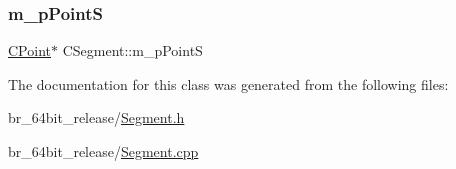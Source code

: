 \subsubsection{\texorpdfstring{m\_pPointS}{m\_pPointS}}
{\footnotesize\ttfamily \mbox{\hyperlink{classCPoint}{C\+Point}}$\ast$ C\+Segment\+::m\+\_\+p\+PointS}



The documentation for this class was generated from the following files\+:\begin{DoxyCompactItemize}
\item 
br\+\_\+64bit\+\_\+release/\mbox{\hyperlink{Segment_8h}{Segment.\+h}}\item 
br\+\_\+64bit\+\_\+release/\mbox{\hyperlink{Segment_8cpp}{Segment.\+cpp}}\end{DoxyCompactItemize}

